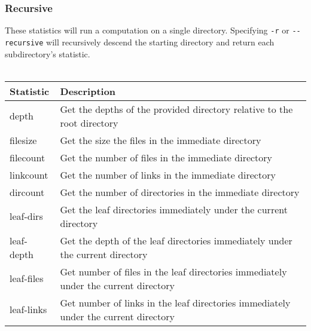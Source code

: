 \subsubsection{Recursive}
These statistics will run a computation on a single
directory. Specifying \texttt{-r} or \texttt{-{}-recursive} will
recursively descend the starting directory and return each
subdirectory's statistic.
\\\\
\begin{tabular} {| l | l |}
  \hline
  Statistic & Description \\
  \hline
  depth & Get the depths of the provided directory relative to the root
  directory \\
  \hline
  filesize & Get the size the files in the immediate directory \\
  \hline
  filecount & Get the number of files in the immediate directory \\
  \hline
  linkcount & Get the number of links in the immediate directory \\
  \hline
  dircount & Get the number of directories in the immediate directory \\
  \hline
  leaf-dirs & Get the leaf directories immediately under the current
  directory \\
  \hline
  leaf-depth & Get the depth of the leaf directories immediately under
  the current directory \\
  \hline
  leaf-files & Get number of files in the leaf directories immediately
  under the current directory \\
  \hline
  leaf-links & Get number of links in the leaf directories immediately
  under the current directory \\
  \hline
\end{tabular}

